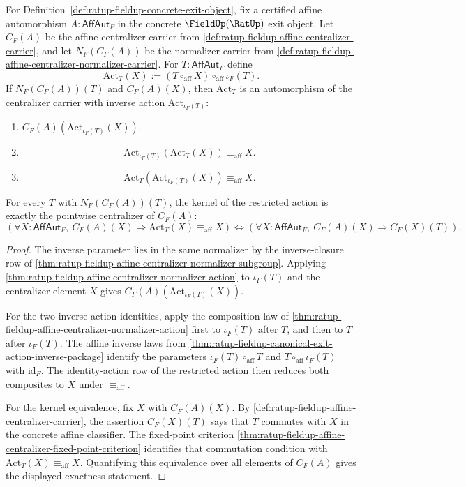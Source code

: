 \begin{theorem}
\label{thm:ratup-fieldup-restricted-normalizer-action-automorphism-kernel-exactness}
For Definition~\ref{def:ratup-fieldup-concrete-exit-object}, fix a certified
affine automorphism $A:\mathsf{AffAut}_F$ in the concrete
$\FieldUp(\RatUp)$ exit object. Let $C_F(A)$ be the affine centralizer carrier
from \autoref{def:ratup-fieldup-affine-centralizer-carrier}, and let
$N_F(C_F(A))$ be the normalizer carrier from
\autoref{def:ratup-fieldup-affine-centralizer-normalizer-carrier}. For
$T:\mathsf{AffAut}_F$ define
$$
\mathrm{Act}_T(X):=(T\circ_{\mathrm{aff}}X)\circ_{\mathrm{aff}}\iota_F(T).
$$
If $N_F(C_F(A))(T)$ and $C_F(A)(X)$, then $\mathrm{Act}_T$ is an
automorphism of the centralizer carrier with inverse action
$\mathrm{Act}_{\iota_F(T)}$:
\begin{enumerate}
\item $C_F(A)(\mathrm{Act}_{\iota_F(T)}(X))$.
\item
$$
\mathrm{Act}_{\iota_F(T)}(\mathrm{Act}_T(X))\equiv_{\mathrm{aff}}X.
$$
\item
$$
\mathrm{Act}_T(\mathrm{Act}_{\iota_F(T)}(X))\equiv_{\mathrm{aff}}X.
$$
\end{enumerate}
For every $T$ with $N_F(C_F(A))(T)$, the kernel of the restricted action is
exactly the pointwise centralizer of $C_F(A)$:
$$
(\forall X:\mathsf{AffAut}_F,\ C_F(A)(X)\Rightarrow
\mathrm{Act}_T(X)\equiv_{\mathrm{aff}}X)
\Longleftrightarrow
(\forall X:\mathsf{AffAut}_F,\ C_F(A)(X)\Rightarrow C_F(X)(T)).
$$
\end{theorem}
\begin{proof}
The inverse parameter lies in the same normalizer by the inverse-closure row of
\autoref{thm:ratup-fieldup-affine-centralizer-normalizer-subgroup}. Applying
\autoref{thm:ratup-fieldup-affine-centralizer-normalizer-action} to
$\iota_F(T)$ and the centralizer element $X$ gives
$C_F(A)(\mathrm{Act}_{\iota_F(T)}(X))$.

For the two inverse-action identities, apply the composition law of
\autoref{thm:ratup-fieldup-affine-centralizer-normalizer-action} first to
$\iota_F(T)$ after $T$, and then to $T$ after $\iota_F(T)$. The affine inverse
laws from
\autoref{thm:ratup-fieldup-canonical-exit-action-inverse-package} identify the
parameters $\iota_F(T)\circ_{\mathrm{aff}}T$ and
$T\circ_{\mathrm{aff}}\iota_F(T)$ with $\mathrm{id}_F$. The identity-action row
of the restricted action then reduces both composites to $X$ under
$\equiv_{\mathrm{aff}}$.

For the kernel equivalence, fix $X$ with $C_F(A)(X)$. By
\autoref{def:ratup-fieldup-affine-centralizer-carrier}, the assertion
$C_F(X)(T)$ says that $T$ commutes with $X$ in the concrete affine classifier.
The fixed-point criterion
\autoref{thm:ratup-fieldup-affine-centralizer-fixed-point-criterion} identifies
that commutation condition with
$\mathrm{Act}_T(X)\equiv_{\mathrm{aff}}X$. Quantifying this equivalence over
all elements of $C_F(A)$ gives the displayed exactness statement.
\end{proof}

